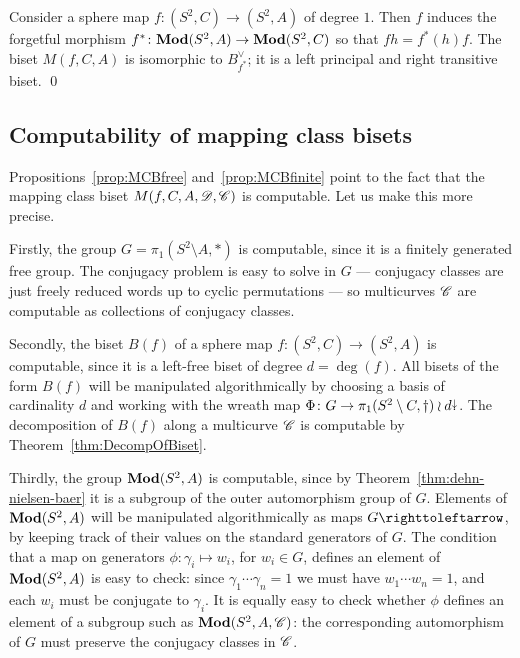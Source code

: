 \documentclass{amsart}
\begin{document}
\begin{lem}\label{lem:mcb of homeo}
  Consider a sphere map $f\colon (S^2,C)\to (S^2,A)$ of degree
  $1$. Then $f$ induces the forgetful morphism
  $f^*\colon \mathbf{\relax Mod} (S^2,A)\to \mathbf{\relax Mod}(S^2,C)$ so that $f h= f^*(h) f$. The
  biset $M(f,C,A)$ is isomorphic to $B_{f^*}^{\vee}$; it is a left
  principal and right transitive biset. \qed
\end{lem}
\subsection{Computability of mapping class bisets}
Propositions~\ref{prop:MCBfree} and~\ref{prop:MCBfinite} point to the
fact that the mapping class biset $M(f,C,A,{\mathscr D},{\mathscr C})$ is
computable. Let us make this more precise.

Firstly, the group $G=\pi_1(S^2\setminus A,*)$ is computable, since it
is a finitely generated free group. The conjugacy problem is easy to
solve in $G$ --- conjugacy classes are just freely reduced words up to
cyclic permutations --- so multicurves ${\mathscr C}$ are computable as
collections of conjugacy classes.

Secondly, the biset $B(f)$ of a sphere map $f\colon(S^2,C)\to(S^2,A)$
is computable, since it is a left-free biset of degree
$d=\deg(f)$. All bisets of the form $B(f)$ will be manipulated
algorithmically by choosing a basis of cardinality $d$ and working
with the wreath map
$\Phi\colon G\to\pi_1(S^2\setminus C,\dagger)\wr d{\stackrel{\downarrow}{\smash.}}$. The
decomposition of $B(f)$ along a multicurve ${\mathscr C}$ is computable by
Theorem~\ref{thm:DecompOfBiset}.

Thirdly, the group $\mathbf{\relax Mod}(S^2,A)$ is computable, since by
Theorem~\ref{thm:dehn-nielsen-baer} it is a subgroup of the outer automorphism
group of $G$. Elements of $\mathbf{\relax Mod}(S^2,A)$ will be manipulated
algorithmically as maps $G\selfmap$, by keeping track of
their values on the standard generators of $G$. The condition that a
map on generators $\phi\colon\gamma_i\mapsto w_i$, for $w_i\in G$,
defines an element of $\mathbf{\relax Mod}(S^2,A)$ is easy to check: since
$\gamma_1\cdots\gamma_n=1$ we must have $w_1\cdots w_n=1$, and each
$w_i$ must be conjugate to $\gamma_i$. It is equally easy to check
whether $\phi$ defines an element of a subgroup such as
$\mathbf{\relax Mod}(S^2,A,{\mathscr C})$: the corresponding automorphism of $G$ must
preserve the conjugacy classes in ${\mathscr C}$.
\end{document}
